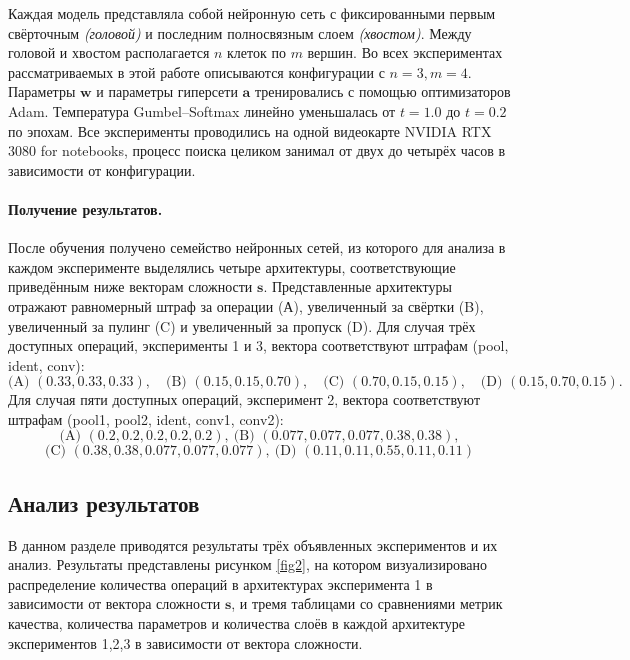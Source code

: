 \documentclass{article}
\begin{document}
Каждая модель представляла собой нейронную сеть с фиксированными первым свёрточным \textit{(головой)} и последним полносвязным слоем \textit{(хвостом)}. Между головой и хвостом располагается $n$ клеток по $m$ вершин. Во всех экспериментах рассматриваемых в этой работе описываются конфигурации с $n=3, m=4$. Параметры $\boldsymbol w$ и параметры гиперсети $\boldsymbol a$ тренировались с помощью оптимизаторов Adam. Температура Gumbel–Softmax линейно уменьшалась от \(t{=}1.0\) до \(t{=}0.2\) по эпохам. Все эксперименты проводились на одной видеокарте NVIDIA RTX 3080 for notebooks, процесс поиска целиком занимал от двух до четырёх часов в зависимости от конфигурации.

\paragraph{Получение результатов.}
После обучения получено семейство нейронных сетей, из которого для анализа в каждом эксперименте выделялись четыре архитектуры, соответствующие приведённым ниже векторам сложности $\boldsymbol{s}$. Представленные архитектуры отражают равномерный штраф за операции (А), увеличенный за свёртки (B), увеличенный за пулинг (C) и увеличенный за пропуск (D). 
Для случая трёх доступных операций, эксперименты 1 и 3, вектора соответствуют штрафам (pool, ident, conv):
\[
\text{(A) } (0.33,0.33,0.33),\quad
\text{(B) } (0.15,0.15,0.70),\quad
\text{(C) } (0.70,0.15,0.15),\quad
\text{(D) } (0.15,0.70,0.15).
\]
Для случая пяти доступных операций, эксперимент 2, вектора соответствуют штрафам (pool1, pool2, ident, conv1, conv2):
\[
\text{(A) } (0.2,0.2,0.2,0.2,0.2),\ 
\text{(B) } (0.077, 0.077, 0.077, 0.38, 0.38),
\]
\[
\text{(C) } (0.38, 0.38, 0.077, 0.077, 0.077),\
\text{(D) } (0.11,0.11,0.55,0.11,0.11)
\]


\subsection{Анализ результатов}

В данном разделе приводятся результаты трёх объявленных экспериментов и их анализ. Результаты представлены рисунком \ref{fig2}, на котором визуализировано распределение количества операций в архитектурах эксперимента 1 в зависимости от вектора сложности $\boldsymbol s$, и тремя таблицами со сравнениями метрик качества, количества параметров и количества слоёв в каждой архитектуре экспериментов 1,2,3 в зависимости от вектора сложности. 
\end{document}

